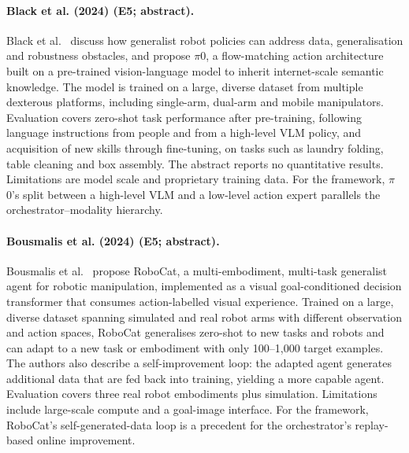 \documentclass[10pt,a4paper]{article}
\begin{document}
\paragraph{Black et al. (2024) (E5; abstract).} Black et al.~\cite{Black2024} discuss how generalist robot policies can address data, generalisation and robustness obstacles, and propose $\pi$0, a flow-matching action architecture built on a pre-trained vision-language model to inherit internet-scale semantic knowledge. The model is trained on a large, diverse dataset from multiple dexterous platforms, including single-arm, dual-arm and mobile manipulators. Evaluation covers zero-shot task performance after pre-training, following language instructions from people and from a high-level VLM policy, and acquisition of new skills through fine-tuning, on tasks such as laundry folding, table cleaning and box assembly. The abstract reports no quantitative results. Limitations are model scale and proprietary training data. For the framework, $\pi$0's split between a high-level VLM and a low-level action expert parallels the orchestrator--modality hierarchy.

\paragraph{Bousmalis et al. (2024) (E5; abstract).} Bousmalis et al.~\cite{Bousmalis2023} propose RoboCat, a multi-embodiment, multi-task generalist agent for robotic manipulation, implemented as a visual goal-conditioned decision transformer that consumes action-labelled visual experience. Trained on a large, diverse dataset spanning simulated and real robot arms with different observation and action spaces, RoboCat generalises zero-shot to new tasks and robots and can adapt to a new task or embodiment with only 100--1,000 target examples. The authors also describe a self-improvement loop: the adapted agent generates additional data that are fed back into training, yielding a more capable agent. Evaluation covers three real robot embodiments plus simulation. Limitations include large-scale compute and a goal-image interface. For the framework, RoboCat's self-generated-data loop is a precedent for the orchestrator's replay-based online improvement.
\end{document}
